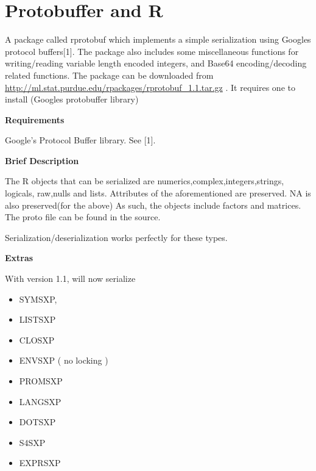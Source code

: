 \documentclass[letterpaper,10pt,english]{manual}
\begin{document}
\resetcurrentobjects
\hypertarget{--doc-ProtoBuffers}{}

\chapter{Protobuffer and R}

A package called rprotobuf which implements a simple serialization using Googles
protocol buffers{[}1{]}.  The package also includes some miscellaneous functions for
writing/reading variable length encoded integers, and Base64 encoding/decoding
related functions.  The package can be downloaded from
\href{http://ml.stat.purdue.edu/rpackages/rprotobuf\_1.1.tar.gz}{http://ml.stat.purdue.edu/rpackages/rprotobuf\_1.1.tar.gz} . It requires one to install 
(Googles protobuffer library)

\textbf{Requirements}

Google's Protocol Buffer library. See {[}1{]}.

\textbf{Brief Description}

The R objects that can be serialized are numerics,complex,integers,strings, logicals,
raw,nulls and lists.  Attributes of the aforementioned are preserved. NA is also
preserved(for the above) As such, the objects include factors and matrices.  The proto file can be
found in the source.

Serialization/deserialization works perfectly for these types.

\textbf{Extras}

With version 1.1,  will now serialize
\begin{itemize}
\item {} 
SYMSXP,

\item {} 
LISTSXP

\item {} 
CLOSXP

\item {} 
ENVSXP ( no locking )

\item {} 
PROMSXP

\item {} 
LANGSXP

\item {} 
DOTSXP

\item {} 
S4SXP

\item {} 
EXPRSXP

\end{itemize}
\end{document}

